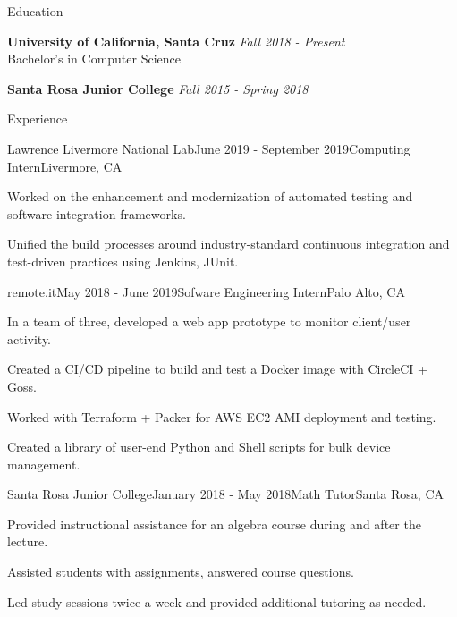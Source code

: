 \documentclass{resume} %
\begin{document}

\begin{rSection}{Education}

{\bf University of California, Santa Cruz} \hfill {\em Fall 2018 - Present} \\ 
Bachelor's in Computer Science

{\bf Santa Rosa Junior College} \hfill {\em Fall 2015 - Spring 2018}

\end{rSection}


\begin{rSection}{Experience}

\begin{rSubsection}{Lawrence Livermore National Lab}{June 2019 - September 2019}{Computing Intern}{Livermore, CA}
    \item Worked on the enhancement and modernization of automated testing and software integration frameworks.
    \item Unified the build processes around industry-standard continuous integration and test-driven practices using Jenkins, JUnit.
\end{rSubsection}


\begin{rSubsection}{remote.it}{May 2018 - June 2019}{Sofware Engineering Intern}{Palo Alto, CA}
    \item In a team of three, developed a web app prototype to monitor client/user activity.
    \item Created a CI/CD pipeline to build and test a Docker image with CircleCI + Goss.
    \item Worked with Terraform + Packer for AWS EC2 AMI deployment and testing.
    \item Created a library of user-end Python and Shell scripts for bulk device management.
\end{rSubsection}


\begin{rSubsection}{Santa Rosa Junior College}{January 2018 - May 2018}{Math Tutor}{Santa Rosa, CA}
    \item Provided instructional assistance for an algebra course during and after the lecture. 
    \item Assisted students with assignments, answered course questions. 
    \item Led study sessions twice a week and provided additional tutoring as needed.
\end{rSubsection}

\end{rSection}
\end{document}
